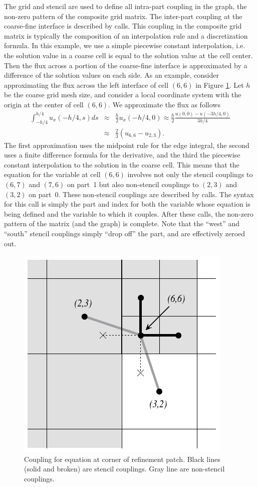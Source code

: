The grid and stencil are used to define all intra-part coupling in the graph,
the non-zero pattern of the composite grid matrix.  The inter-part coupling at
the coarse-fine interface is described by  calls.  This
coupling in the composite grid matrix is typically the composition of an
interpolation rule and a discretization formula.  In this example, we use a
simple piecewise constant interpolation, i.e. the solution value in a coarse
cell is equal to the solution value at the cell center.  Then the flux across a
portion of the coarse-fine interface is approximated by a difference of the
solution values on each side.  As an example, consider approximating the flux
across the left interface of cell $(6,6)$ in Figure
\ref{fig-sstruct-samr-stencil}.  Let $h$ be the coarse grid mesh size, and
consider a local coordinate system with the origin at the center of cell
$(6,6)$.  We approximate the flux as follows
\begin{eqnarray}
\int_{-h/4}^{h/4}{u_x(-h/4,s)} ds
& \approx & \frac{h}{2} u_x(-h/4,0)
  \approx \frac{h}{2} \frac{u(0,0)-u(-3h/4,0)}{3h/4} \\
& \approx & \frac{2}{3} (u_{6,6}-u_{2,3}) \nonumber .
\end{eqnarray} 
The first approximation uses the midpoint rule for the edge integral, the
second uses a finite difference formula for the derivative, and the third the
piecewise constant interpolation to the solution in the coarse cell.  This
means that the equation for the variable at cell $(6,6)$ involves not only the
stencil couplings to $(6,7)$ and $(7,6)$ on part~1 but also non-stencil
couplings to $(2,3)$ and $(3,2)$ on part~0.  These non-stencil couplings are
described by  calls.  The syntax for this call is
simply the part and index for both the variable whose equation is being defined
and the variable to which it couples.  After these calls, the non-zero pattern
of the matrix (and the graph) is complete.  Note that the ``west'' and
``south'' stencil couplings simply ``drop off'' the part, and are effectively
zeroed out.

\begin{figure}
\centering
\includegraphics[width=.4\textwidth]{figSStructExample2b}
\caption{%
Coupling for equation at corner of refinement patch. Black lines
(solid and broken) are stencil couplings. Gray line are non-stencil
couplings.}
\label{fig-sstruct-samr-stencil}
\end{figure}

